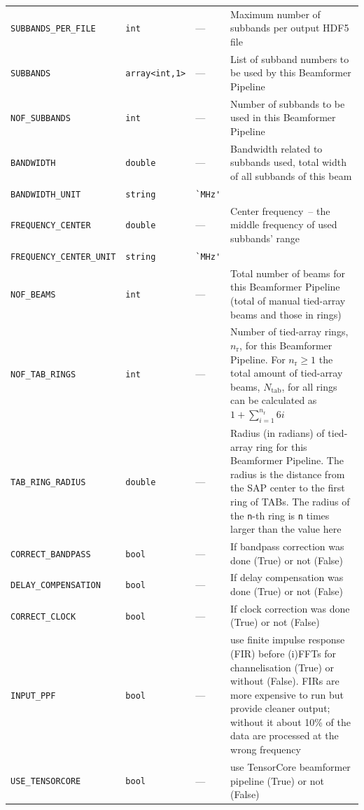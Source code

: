 \documentclass[a4paper,10pt,bibtotoc]{scrartcl}
\begin{document}
\begin{supertabular}{|lllp{5.5cm}|}
    \verb|SUBBANDS_PER_FILE| & \verb|int| & --- & Maximum number of subbands per output HDF5 file \\
    \verb|SUBBANDS| & \verb|array<int,1>| & --- & List of subband numbers to be used by this Beamformer Pipeline \\
    \verb|NOF_SUBBANDS| & \verb|int| & --- & Number of subbands to be used in this Beamformer Pipeline \\
    \verb|BANDWIDTH| & \verb|double| & --- & Bandwidth related to subbands used, total width of all subbands of this beam \\
    \verb|BANDWIDTH_UNIT|  & \verb|string| & \verb|`MHz'| &  \\
    \small{\verb|FREQUENCY_CENTER|}  & \verb|double| & --- & Center frequency~-- the middle frequency of used subbands' range \\
    \small{\verb|FREQUENCY_CENTER_UNIT|}  & \verb|string| & \verb|`MHz'| & \\
    \verb|NOF_BEAMS|  & \verb|int| & --- & Total number of beams for this Beamformer Pipeline (total of manual tied-array beams and those in rings) \\
    \verb|NOF_TAB_RINGS| & \verb|int| & --- & Number of tied-array rings, $n_\mathrm{r}$, for this Beamformer Pipeline. For $n_\mathrm{r}\ge 1$ the total amount of tied-array beams, $N_\mathrm{tab}$, for all rings can be calculated as $1+\sum_{i=1}^{n_\mathrm{r}} 6i$ \\
    \verb|TAB_RING_RADIUS| & \verb|double| & --- & Radius (in radians) of tied-array ring for this Beamformer Pipeline. The radius is the distance from the SAP center to the first ring of TABs. The radius of the \verb|n|-th ring is \verb|n| times larger than the value here \\
    \verb|CORRECT_BANDPASS| & \verb|bool| & --- & If bandpass correction was done (True) or not (False) \\
    \verb|DELAY_COMPENSATION| & \verb|bool| & --- & If delay compensation was done (True) or not (False) \\
    \verb|CORRECT_CLOCK| & \verb|bool| & --- & If clock correction was done (True) or not (False) \\
    \verb|INPUT_PPF| & \verb|bool| & --- & use finite impulse response (FIR) before (i)FFTs for channelisation (True) or without (False). FIRs are more expensive to run but provide cleaner output; without it about 10\% of the data are processed at the wrong frequency \\
    \verb|USE_TENSORCORE| & \verb|bool| & --- & use TensorCore beamformer pipeline (True) or not (False) \\
    \hline
  \end{supertabular}
\end{document}
